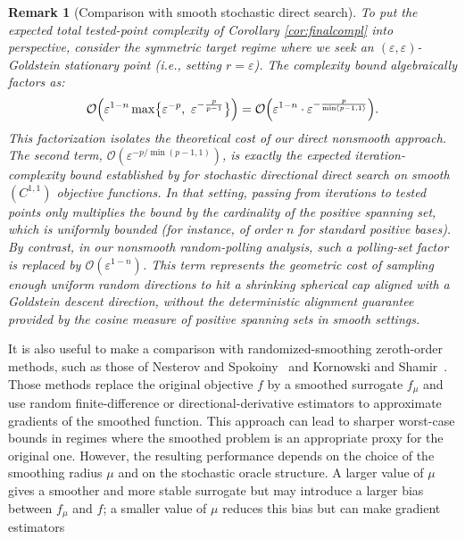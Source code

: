 \documentclass[11pt,a4paper]{article}
\newtheorem{remark}{Remark}[section]
\newcommand{\goldelta}{r}
\begin{document}

\begin{remark}[Comparison with smooth stochastic direct search]
\label{rem:complexity_comparison_smooth}
To put the expected total tested-point complexity of Corollary \ref{cor:finalcompl} into perspective, consider the symmetric target regime where we seek an $(\varepsilon, \varepsilon)$-Goldstein stationary point (i.e., setting $\goldelta = \varepsilon$). The complexity bound algebraically factors as:
\[
   \mathcal O\Bigl( \varepsilon^{1-n}  \max\bigl\{\varepsilon^{-p},\ \varepsilon^{-\frac{p}{p-1}}\bigr\} \Bigr) 
   = \mathcal O\Bigl( \varepsilon^{1-n} \cdot \varepsilon^{-\frac{p}{\min(p-1, 1)}} \Bigr).
\]
This factorization isolates the theoretical cost of our direct nonsmooth approach. The second term,
\(\mathcal O(\varepsilon^{-p/\min(p-1,1)})\), is exactly the expected iteration-complexity
bound established by \cite{MR4359469} for stochastic directional direct search on smooth
\((C^{1,1})\) objective functions. In that setting, passing from iterations to tested points only
multiplies the bound by the cardinality of the positive spanning set, which is uniformly bounded
(for instance, of order \(n\) for standard positive bases). By contrast, in our nonsmooth random-polling
analysis, such a polling-set factor is replaced by
\(\mathcal O(\varepsilon^{1-n})\). This term represents the geometric cost of sampling enough
uniform random directions to hit a shrinking spherical cap aligned with a Goldstein descent
direction, without the deterministic alignment guarantee provided by the cosine measure of
positive spanning sets in smooth settings.
\end{remark}
It is also useful to make a comparison with randomized-smoothing
zeroth-order methods, such as those of Nesterov and Spokoiny~\cite{MR3627456}
and Kornowski and Shamir~\cite{JMLR:kornowskishamir}.
Those methods replace the original objective \(f\) by a smoothed surrogate
\(f_\mu\) and use random finite-difference or directional-derivative estimators
to approximate gradients of the smoothed function. This approach can lead to
sharper worst-case bounds in regimes where the smoothed problem is an
appropriate proxy for the original one. However, the resulting performance
depends on the choice of the smoothing radius \(\mu\) and on the stochastic
oracle structure. A larger value of \(\mu\) gives a smoother and more stable
surrogate but may introduce a larger bias between \(f_\mu\) and \(f\); a
smaller value of \(\mu\) reduces this bias but can make gradient estimators
\end{document}
